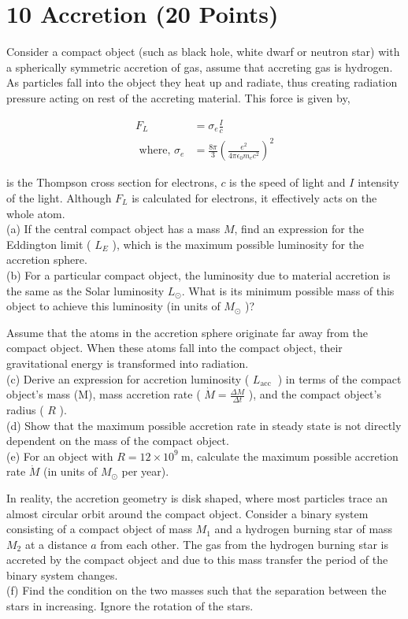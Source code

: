 \documentclass[10pt]{article}
\begin{document}
\section*{10 Accretion (20 Points)}
Consider a compact object (such as black hole, white dwarf or neutron star) with a spherically symmetric accretion of gas, assume that accreting gas is hydrogen. As particles fall into the object they heat up and radiate, thus creating radiation pressure acting on rest of the accreting material. This force is given by,

$$
\begin{aligned}
F_{L} & =\sigma_{e} \frac{I}{c} \\
\text { where, } \sigma_{e} & =\frac{8 \pi}{3}\left(\frac{e^{2}}{4 \pi \epsilon_{0} m_{e} c^{2}}\right)^{2}
\end{aligned}
$$

is the Thompson cross section for electrons, $c$ is the speed of light and $I$ intensity of the light. Although $F_{L}$ is calculated for electrons, it effectively acts on the whole atom.\\
(a) If the central compact object has a mass $M$, find an expression for the Eddington limit ( $L_{E}$ ), which is the maximum possible luminosity for the accretion sphere.\\
(b) For a particular compact object, the luminosity due to material accretion is the same as the Solar luminosity $L_{\odot}$. What is its minimum possible mass of this object to achieve this luminosity (in units of $M_{\odot}$ )?

Assume that the atoms in the accretion sphere originate far away from the compact object. When these atoms fall into the compact object, their gravitational energy is transformed into radiation.\\
(c) Derive an expression for accretion luminosity ( $L_{\text {acc }}$ ) in terms of the compact object's mass (M), mass accretion rate ( $\dot{M}=\frac{\Delta M}{\Delta t}$ ), and the compact object's radius ( $R$ ).\\
(d) Show that the maximum possible accretion rate in steady state is not directly dependent on the mass of the compact object.\\
(e) For an object with $R=12 \times 10^{9} \mathrm{~m}$, calculate the maximum possible accretion rate $\dot{M}$ (in units of $M_{\odot}$ per year).

In reality, the accretion geometry is disk shaped, where most particles trace an almost circular orbit around the compact object. Consider a binary system consisting of a compact object of mass $M_{1}$ and a hydrogen burning star of mass $M_{2}$ at a distance $a$ from each other. The gas from the hydrogen burning star is accreted by the compact object and due to this mass transfer the period of the binary system changes.\\
(f) Find the condition on the two masses such that the separation between the stars in increasing. Ignore the rotation of the stars.
\end{document}
